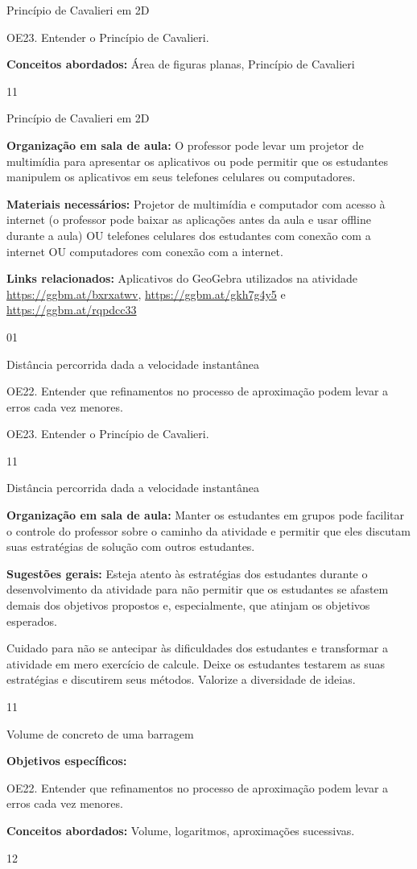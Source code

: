 \cleardoublepage
\def\currentcolor{session1}
\begin{objectives}{Princípio de Cavalieri em 2D}
{
OE23. Entender o Princípio de Cavalieri.

\textbf{Conceitos abordados:} Área de figuras planas, Princípio de Cavalieri
}{1}{1}
\end{objectives}
\begin{sugestions}{Princípio de Cavalieri em 2D}
{
\textbf{Organização em sala de aula:} O professor pode levar um projetor de multimídia para apresentar os aplicativos ou pode permitir que os estudantes manipulem os aplicativos em seus telefones celulares ou computadores.

\textbf{Materiais necessários:} Projetor de multimídia e computador com acesso à internet (o professor pode baixar as aplicações antes da aula e usar offline durante a aula) OU telefones celulares dos estudantes com conexão com a internet OU computadores com conexão com a internet.

\textbf{Links relacionados:} Aplicativos do GeoGebra utilizados na atividade \url{https://ggbm.at/bxrxatwv}, \url{https://ggbm.at/gkh7g4y5} e \url{https://ggbm.at/rqpdcc33}
}{0}{1}
\end{sugestions}
\begin{objectives}{Distância percorrida dada a velocidade instantânea}
{
OE22. Entender que refinamentos no processo de aproximação podem levar a erros cada vez menores.

OE23. Entender o Princípio de Cavalieri.
}{1}{1}
\end{objectives}
\begin{sugestions}{Distância percorrida dada a velocidade instantânea}
{
\textbf{Organização em sala de aula:} Manter os estudantes em grupos pode facilitar o controle do professor sobre o caminho da atividade e permitir que eles discutam suas estratégias de solução com outros estudantes.

\textbf{Sugestões gerais:} Esteja atento às estratégias dos estudantes durante o desenvolvimento da atividade para não permitir que os estudantes se afastem demais dos objetivos propostos e, especialmente, que atinjam os objetivos esperados.

Cuidado para não se antecipar às dificuldades dos estudantes e transformar a atividade em mero exercício de calcule. Deixe os estudantes testarem as suas estratégias e discutirem seus métodos. Valorize a diversidade de ideias.
}{1}{1}
\end{sugestions}
\clearmargin
\begin{objectives}{Volume de concreto de uma barragem}
{
\textbf{Objetivos específicos:}

OE22. Entender que refinamentos no processo de aproximação podem levar a erros cada vez menores.

\textbf{Conceitos abordados:} Volume, logaritmos, aproximações sucessivas.
}{1}{2}
\end{objectives}
